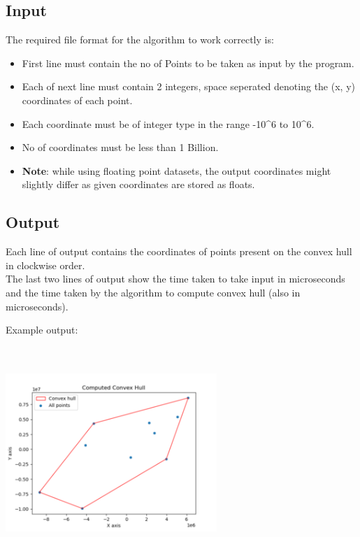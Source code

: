 \hypertarget{input}{%
\subsection{Input}\label{input}}

The required file format for the algorithm to work correctly is:

\begin{itemize}
\tightlist
\item
  First line must contain the no of Points to be taken as input by the
  program.
\item
  Each of next line must contain 2 integers, space seperated denoting
  the (x, y) coordinates of each point.
\item
  Each coordinate must be of integer type in the range -10\^{}6 to
  10\^{}6.
\item
  No of coordinates must be less than 1 Billion.
\item
  \textbf{Note}: while using floating point datasets, the output
  coordinates might slightly differ as given coordinates are stored as
  floats.
\end{itemize}

\hypertarget{output}{%
\subsection{Output}\label{output}}

Each line of output contains the coordinates of points present on the
convex hull in clockwise order.\\
The last two lines of output show the time taken to take input in
microseconds and the time taken by the algorithm to compute convex hull
(also in microseconds).

Example output:

\includegraphics[width=8cm,height=8cm]{img/CH10.png}\\

